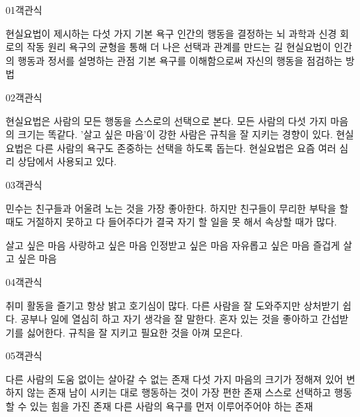 \documentclass[fs85,seriesRus]{korfarm-base}
\begin{document}
\par\medskip
\kfBeginMC
\begin{kfQBlock}{01}{객관식}
\begin{kfChoices}
\kfChoice 현실요법이 제시하는 다섯 가지 기본 욕구
\kfChoice 인간의 행동을 결정하는 뇌 과학과 신경 회로의 작동 원리
\kfChoice 욕구의 균형을 통해 더 나은 선택과 관계를 만드는 길
\kfChoice 현실요법이 인간의 행동과 정서를 설명하는 관점
\kfChoice 기본 욕구를 이해함으로써 자신의 행동을 점검하는 방법
\end{kfChoices}
\end{kfQBlock}
\begin{kfQBlock}{02}{객관식}
\begin{kfChoices}
\kfChoice 현실요법은 사람의 모든 행동을 스스로의 선택으로 본다.
\kfChoice 모든 사람의 다섯 가지 마음의 크기는 똑같다.
\kfChoice '살고 싶은 마음'이 강한 사람은 규칙을 잘 지키는 경향이 있다.
\kfChoice 현실요법은 다른 사람의 욕구도 존중하는 선택을 하도록 돕는다.
\kfChoice 현실요법은 요즘 여러 심리 상담에서 사용되고 있다.
\end{kfChoices}
\end{kfQBlock}
\begin{kfQBlock}{03}{객관식}
\begin{kfEvidence}민수는 친구들과 어울려 노는 것을 가장 좋아한다. 하지만 친구들이 무리한 부탁을 할 때도 거절하지 못하고 다 들어주다가 결국 자기 할 일을 못 해서 속상할 때가 많다.\end{kfEvidence}
\begin{kfChoices}
\kfChoice 살고 싶은 마음
\kfChoice 사랑하고 싶은 마음
\kfChoice 인정받고 싶은 마음
\kfChoice 자유롭고 싶은 마음
\kfChoice 즐겁게 살고 싶은 마음
\end{kfChoices}
\end{kfQBlock}
\begin{kfQBlock}{04}{객관식}
\begin{kfChoices}
\kfChoice 취미 활동을 즐기고 항상 밝고 호기심이 많다.
\kfChoice 다른 사람을 잘 도와주지만 상처받기 쉽다.
\kfChoice 공부나 일에 열심히 하고 자기 생각을 잘 말한다.
\kfChoice 혼자 있는 것을 좋아하고 간섭받기를 싫어한다.
\kfChoice 규칙을 잘 지키고 필요한 것을 아껴 모은다.
\end{kfChoices}
\end{kfQBlock}
\begin{kfQBlock}{05}{객관식}
\begin{kfChoices}
\kfChoice 다른 사람의 도움 없이는 살아갈 수 없는 존재
\kfChoice 다섯 가지 마음의 크기가 정해져 있어 변하지 않는 존재
\kfChoice 남이 시키는 대로 행동하는 것이 가장 편한 존재
\kfChoice 스스로 선택하고 행동할 수 있는 힘을 가진 존재
\kfChoice 다른 사람의 욕구를 먼저 이루어주어야 하는 존재
\end{kfChoices}
\end{kfQBlock}
\end{document}
